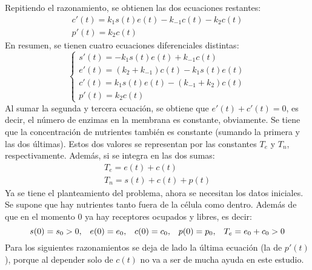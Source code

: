 Repitiendo el razonamiento, se obtienen las dos ecuaciones restantes:
\[
\begin{array}{l}
c'(t)=k_1s(t)e(t)-k_{-1}c(t)-k_2c(t)\\
p'(t)=k_2c(t)
\end{array}
\]
En resumen, se tienen cuatro ecuaciones diferenciales distintas:
\[
\left\{
\begin{array}{l}
s'(t)=-k_1s(t)e(t)+k_{-1}c(t)\\
e'(t)=\left(k_2+k_{-1}\right)c(t)-k_1s(t)e(t)\\
c'(t)=k_1s(t)e(t)-\left(k_{-1}+k_2\right)c(t)\\
p'(t)=k_2c(t)
\end{array}
\right.
\]
Al sumar la segunda y tercera ecuación, se obtiene que $e'(t)+c'(t)=0$, es decir, el número de enzimas en la membrana es constante, obviamente. Se tiene que la concentración de nutrientes también es constante (sumando la primera y las dos últimas). Estos dos valores se representan por las constantes $T_e$ y $T_n$, respectivamente. Además, si se integra en las dos sumas:
\[
\begin{array}{l}
T_e=e(t)+c(t)\\
T_n=s(t)+c(t)+p(t)
\end{array}
\]
Ya se tiene el planteamiento del problema, ahora se necesitan los datos iniciales. Se supone que hay nutrientes tanto fuera de la célula como dentro. Además de que en el momento 0 ya hay receptores ocupados y libres, es decir:
\[
s(0)=s_0>0, \;\;\; e(0)=e_0, \;\;\; c(0)=c_0, \;\;\; p(0)=p_0, \;\;\; T_e=e_0+c_0>0
\]
Para los siguientes razonamientos se deja de lado la última ecuación (la de $p'(t)$), porque al depender solo de $c(t)$ no va a ser de mucha ayuda en este estudio.

